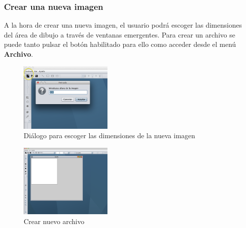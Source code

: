 \subsubsection{Crear una nueva imagen}
A la hora de crear una nueva imagen, el usuario podrá escoger las dimensiones del área de dibujo a través de ventanas emergentes. Para crear un archivo se puede tanto pulsar el botón habilitado para ello como acceder desde el menú \textbf{Archivo}.
\vskip0.3cm
\begin{figure}[H]
 \centering
  \includegraphics[width=0.4\textwidth]{generales/altura.png}
 \caption{Diálogo para escoger las dimensiones de la nueva imagen}
 \label{diseño}
 \end{figure}
\begin{figure}[H]
 \centering
  \includegraphics[width=0.4\textwidth]{generales/nuevo.png}
 \caption{Crear nuevo archivo}
 \label{diseño}
 \end{figure}
